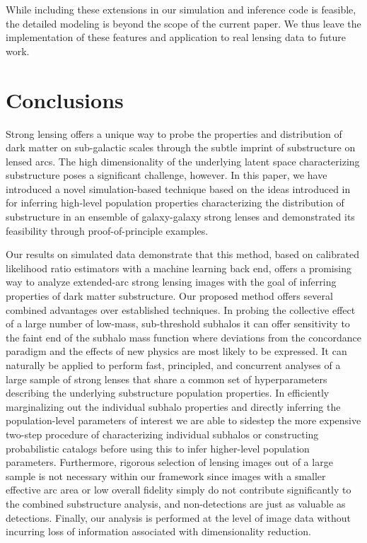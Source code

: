 \documentclass[twocolumn]{aastex63}
\begin{document}
While including these extensions in our simulation and inference code is feasible, the detailed modeling is beyond the scope of the current paper. We thus leave the implementation of these features and application to real lensing data to future work.


\section{Conclusions}
\label{sec:conclusions}

Strong lensing offers a unique way to probe the properties and distribution of dark matter on sub-galactic scales through the subtle imprint of substructure on lensed arcs. The high dimensionality of the underlying latent space characterizing substructure poses a significant challenge, however. In this paper, we have introduced a novel simulation-based technique based on the ideas introduced in~\citet{1805.00013,1805.00020,1805.12244,Stoye:2018ovl} for inferring high-level population properties characterizing the distribution of substructure in an ensemble of galaxy-galaxy strong lenses and demonstrated its feasibility through proof-of-principle examples.

Our results on simulated data demonstrate that this method, based on calibrated likelihood ratio estimators with a machine learning back end, offers a promising way to analyze extended-arc strong lensing images with the goal of inferring properties of dark matter substructure. Our proposed method offers several combined advantages over established techniques. In probing the collective effect of a large number of low-mass, sub-threshold subhalos it can offer sensitivity to the faint end of the subhalo mass function where deviations from the concordance \lcdm paradigm and the effects of new physics are most likely to be expressed. It can naturally be applied to perform fast, principled, and concurrent analyses of a large sample of strong lenses that share a common set of hyperparameters describing the underlying substructure population properties. In efficiently marginalizing out the individual subhalo properties and directly inferring the population-level parameters of interest we are able to sidestep the more expensive two-step procedure of characterizing individual subhalos or constructing probabilistic catalogs before using this to infer higher-level population parameters. Furthermore, rigorous selection of lensing images out of a large sample is not necessary within our framework since images with a smaller effective arc area or low overall fidelity simply do not contribute significantly to the combined substructure analysis, and non-detections are just as valuable as detections. Finally, our analysis is performed at the level of image data without incurring loss of information associated with dimensionality reduction.
\end{document}
